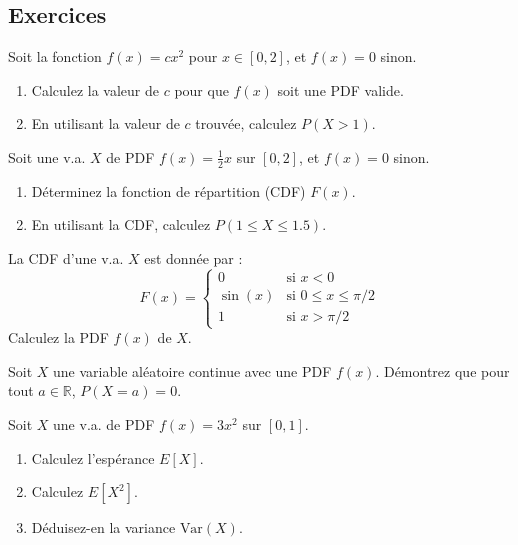 \subsection{Exercices}

\begin{exercicebox}[Exercice 1 :]
Soit la fonction $f(x) = cx^2$ pour $x \in [0, 2]$, et $f(x)=0$ sinon.
\begin{enumerate}
    \item Calculez la valeur de $c$ pour que $f(x)$ soit une PDF valide.
    \item En utilisant la valeur de $c$ trouvée, calculez $P(X > 1)$.
\end{enumerate}
\end{exercicebox}

\begin{exercicebox}[Exercice 2 :]
Soit une v.a. $X$ de PDF $f(x) = \frac{1}{2}x$ sur $[0, 2]$, et $f(x)=0$ sinon.
\begin{enumerate}
    \item Déterminez la fonction de répartition (CDF) $F(x)$.
    \item En utilisant la CDF, calculez $P(1 \le X \le 1.5)$.
\end{enumerate}
\end{exercicebox}

\begin{exercicebox}[Exercice 3 :]
La CDF d'une v.a. $X$ est donnée par :
$$F(x) = \begin{cases} 0 & \text{si } x < 0 \\ \sin(x) & \text{si } 0 \le x \le \pi/2 \\ 1 & \text{si } x > \pi/2 \end{cases}$$
Calculez la PDF $f(x)$ de $X$.
\end{exercicebox}

\begin{exercicebox}[Exercice 4 :]
Soit $X$ une variable aléatoire continue avec une PDF $f(x)$. Démontrez que pour tout $a \in \mathbb{R}$, $P(X = a) = 0$.
\end{exercicebox}

\begin{exercicebox}[Exercice 5 :]
Soit $X$ une v.a. de PDF $f(x) = 3x^2$ sur $[0, 1]$.
\begin{enumerate}
    \item Calculez l'espérance $E[X]$.
    \item Calculez $E[X^2]$.
    \item Déduisez-en la variance $\text{Var}(X)$.
\end{enumerate}
\end{exercicebox}


